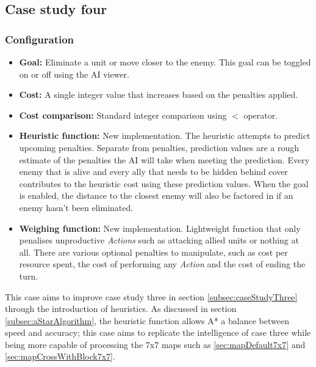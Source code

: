 \documentclass[11pt, a4paper]{report}
\begin{document}
\subsection{Case study four}
\label{subsec:caseStudyFour}

\subsubsection{Configuration}

\begin{itemize}
  \item \textbf{Goal:} Eliminate a unit or move closer to the enemy. This goal can be toggled on or off using the AI viewer.
  \item \textbf{Cost:} A single integer value that increases based on the penalties applied.
  \item \textbf{Cost comparison:} Standard integer comparison using $<$ operator.
  \item \textbf{Heuristic function:} New implementation. The heuristic attempts to predict upcoming penalties. Separate from penalties, prediction values are a rough estimate of the penalties the AI will take when meeting the prediction. Every enemy that is alive and every ally that needs to be hidden behind cover contributes to the heuristic cost using these prediction values. When the goal is enabled, the distance to the closest enemy will also be factored in if an enemy hasn't been eliminated.
  \item \textbf{Weighing function:} New implementation. Lightweight function that only penalises unproductive \emph{Actions} such as attacking allied units or nothing at all. There are various optional penalties to manipulate, such as cost per resource spent, the cost of performing any \emph{Action} and the cost of ending the turn.
\end{itemize}

This case aims to improve case study three in section \ref{subsec:caseStudyThree} through the introduction of heuristics. As discussed in section \ref{subsec:aStarAlgorithm}, the heuristic function allows A* a balance between speed and accuracy; this case aims to replicate the intelligence of case three while being more capable of processing the 7x7 maps such as \ref{sec:mapDefault7x7} and \ref{sec:mapCrossWithBlock7x7}. 
\end{document}

